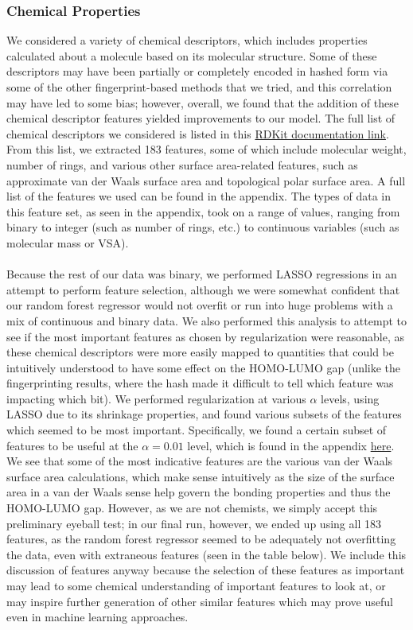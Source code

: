 \documentclass[11pt]{article}
\begin{document}
\subsubsection*{Chemical Properties}
We considered a variety of chemical descriptors, which includes properties calculated about a molecule based on its molecular structure. Some of these descriptors may have been partially or completely encoded in hashed form via some of the other fingerprint-based methods that we tried, and this correlation may have led to some bias; however, overall, we found that the addition of these chemical descriptor features yielded improvements to our model. The full list of chemical descriptors we considered is listed in this \href{http://www.rdkit.org/docs/GettingStartedInPython.html#list-of-available-descriptors}{RDKit documentation link}. From this list, we extracted 183 features, some of which include molecular weight, number of rings, and various other surface area-related features, such as approximate van der Waals surface area and topological polar surface area. A full list of the features we used can be found in the appendix. The types of data in this feature set, as seen in the appendix, took on a range of values, ranging from binary to integer (such as number of rings, etc.) to continuous variables (such as molecular mass or VSA). \\ \\
Because the rest of our data was binary, we performed LASSO regressions in an attempt to perform feature selection, although we were somewhat confident that our random forest regressor would not overfit or run into huge problems with a mix of continuous and binary data. We also performed this analysis to attempt to see if the most important features as chosen by regularization were reasonable, as these chemical descriptors were more easily mapped to quantities that could be intuitively understood to have some effect on the HOMO-LUMO gap (unlike the fingerprinting results, where the hash made it difficult to tell which feature was impacting which bit). We performed regularization at various $\alpha$ levels, using LASSO due to its shrinkage properties, and found various subsets of the features which seemed to be most important. Specifically, we found a certain subset of features to be useful at the $\alpha = 0.01$ level, which is found in the appendix \hyperlink{alphatable}{here}. We see that some of the most indicative features are the various van der Waals surface area calculations, which make sense intuitively as the size of the surface area in a van der Waals sense help govern the bonding properties and thus the HOMO-LUMO gap. However, as we are not chemists, we simply accept this preliminary eyeball test; in our final run, however, we ended up using all 183 features, as the random forest regressor seemed to be adequately not overfitting the data, even with extraneous features (seen in the table below). We include this discussion of features anyway because the selection of these features as important may lead to some chemical understanding of important features to look at, or may inspire further generation of other similar features which may prove useful even in machine learning approaches.
\end{document}

